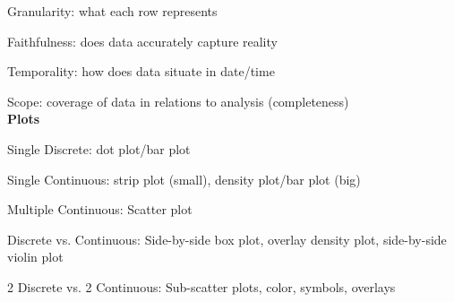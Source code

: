 \documentclass[8pt]{extarticle}
\begin{document}
Granularity: what each row represents

Faithfulness: does data accurately capture reality

Temporality: how does data situate in date/time

Scope: coverage of data in relations to analysis (completeness) \\

\textbf{Plots}

Single Discrete: dot plot/bar plot

Single Continuous: strip plot (small), density plot/bar plot (big) 

Multiple Continuous: Scatter plot

Discrete vs. Continuous: Side-by-side box plot, overlay density plot, side-by-side violin plot

2 Discrete vs. 2 Continuous: Sub-scatter plots, color, symbols, overlays
\end{document}
